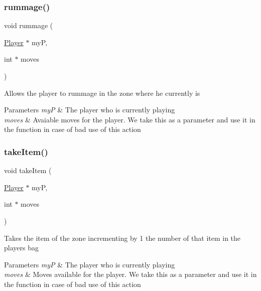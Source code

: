 \subsubsection{\texorpdfstring{rummage()}{rummage()}}
{\footnotesize\ttfamily void rummage (\begin{DoxyParamCaption}\item[{\hyperlink{group__game_gac6f795d0d2e88ee469ddc704329e7cc3}{Player} $\ast$}]{myP,  }\item[{int $\ast$}]{moves }\end{DoxyParamCaption})\hspace{0.3cm}{\ttfamily [static]}}

Allows the player to rummage in the zone where he currently is 
\begin{DoxyParams}{Parameters}
{\em myP} & The player who is currently playing \\
\hline
{\em moves} & Avaiable moves for the player. We take this as a parameter and use it in the function in case of bad use of this action \\
\hline
\end{DoxyParams}
\mbox{\label{group__game_gaa6abddd4d89336e676f85cc4b5562101}} 
\subsubsection{\texorpdfstring{take\+Item()}{takeItem()}}
{\footnotesize\ttfamily void take\+Item (\begin{DoxyParamCaption}\item[{\hyperlink{group__game_gac6f795d0d2e88ee469ddc704329e7cc3}{Player} $\ast$}]{myP,  }\item[{int $\ast$}]{moves }\end{DoxyParamCaption})\hspace{0.3cm}{\ttfamily [static]}}

Takes the item of the zone incrementing by 1 the number of that item in the player\textquotesingle{}s bag 
\begin{DoxyParams}{Parameters}
{\em myP} & The player who is currently playing \\
\hline
{\em moves} & Moves available for the player. We take this as a parameter and use it in the function in case of bad use of this action \\
\hline
\end{DoxyParams}
\mbox{\label{group__game_ga95540730276b746fb5fae9061b50d3ad}} 
